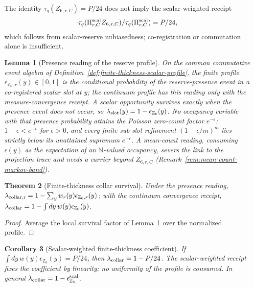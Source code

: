 \documentclass[11pt]{article}
\newtheorem{theorem}{Theorem}[section]
\newtheorem{corollary}[theorem]{Corollary}
\newtheorem{lemma}[theorem]{Lemma}
\theoremstyle{remark}
\theoremstyle{plain}
\begin{document}
The identity \(\tau_q(Z_{6,r,C})=P/24\) does not imply the scalar-weighted
receipt
\[
\tau_q(\Pi^{\rm scal}_{r,C}Z_{6,r,C})/\tau_q(\Pi^{\rm scal}_{r,C})=P/24,
\]
which follows from scalar-reserve unbiasedness; co-registration or
commutation alone is insufficient.

\begin{lemma}[Presence reading of the reserve profile]
\label{lem:presence-reading-reserve}
On the common commutative event algebra of
Definition~\ref{def:finite-thickness-scalar-profile}, the finite profile
\(\epsilon_{\mathbb Z_6,r}(y)\in[0,1]\) is the conditional probability of the
reserve-presence event in a co-registered scalar slot at \(y\); the continuum
profile has this reading only with the measure-convergence receipt. A scalar
opportunity survives exactly when the presence event does not occur, so
\(\lambda_{\rm slot}(y)=1-\epsilon_{\mathbb Z_6}(y)\). No occupancy variable
with that presence probability attains the Poisson zero-count factor
\(e^{-\epsilon}\): \(1-\epsilon<e^{-\epsilon}\) for \(\epsilon>0\), and every
finite sub-slot refinement \((1-\epsilon/m)^m\) lies strictly below its
unattained supremum \(e^{-\epsilon}\). A mean-count reading, consuming
\(\epsilon(y)\) as the expectation of an \(\mathbb N\)-valued occupancy,
severs the link to the projection trace and needs a carrier beyond
\(Z_{6,r,C}\) (Remark~\ref{rem:mean-count-markov-band}).
\end{lemma}

\begin{theorem}[Finite-thickness collar survival]
\label{thm:finite-thickness-collar-survival}
Under the presence reading,
\(\lambda_{\rm collar,r}=1-\sum_yw_r(y)\epsilon_{\mathbb Z_6,r}(y)\); with the
continuum convergence receipt,
\(\lambda_{\rm collar}=1-\int dy\,w(y)\epsilon_{\mathbb Z_6}(y)\).
\end{theorem}

\begin{proof}
Average the local survival factor of
Lemma~\ref{lem:presence-reading-reserve} over the normalized profile.
\end{proof}

\begin{corollary}[Scalar-weighted finite-thickness coefficient]
\label{cor:finite-thickness-jensen-band}
If \(\int dy\,w(y)\epsilon_{\mathbb Z_6}(y)=P/24\), then
\(\lambda_{\rm collar}=1-P/24\). The
scalar-weighted receipt fixes the coefficient by linearity; no uniformity of
the profile is consumed. In general
\(\lambda_{\rm collar}=1-\bar\epsilon_{\mathbb Z_6}^{\rm scal}\).
\end{corollary}
\end{document}
